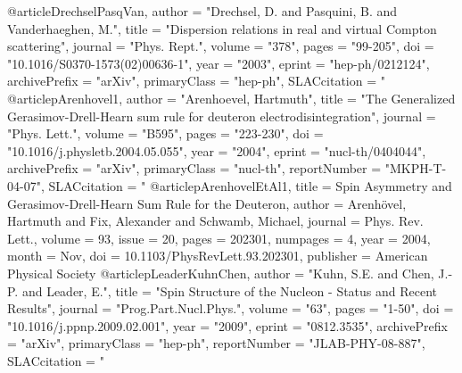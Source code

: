 @article{DrechselPasqVan,
      author         = "Drechsel, D. and Pasquini, B. and Vanderhaeghen, M.",
      title          = "{Dispersion relations in real and virtual Compton scattering}",
      journal        = "Phys. Rept.",
      volume         = "378",
      pages          = "99-205",
      doi            = "10.1016/S0370-1573(02)00636-1",
      year           = "2003",
      eprint         = "hep-ph/0212124",
      archivePrefix  = "arXiv",
      primaryClass   = "hep-ph",
      SLACcitation   = "%
}
@article{pArenhovel1,
      author         = "Arenhoevel, Hartmuth",
      title          = "{The Generalized Gerasimov-Drell-Hearn sum rule for deuteron electrodisintegration}",
      journal        = "Phys. Lett.",
      volume         = "B595",
      pages          = "223-230",
      doi            = "10.1016/j.physletb.2004.05.055",
      year           = "2004",
      eprint         = "nucl-th/0404044",
      archivePrefix  = "arXiv",
      primaryClass   = "nucl-th",
      reportNumber   = "MKPH-T-04-07",
      SLACcitation   = "%
}
@article{pArenhovelEtAl1,
  title = {Spin Asymmetry and Gerasimov-Drell-Hearn Sum Rule for the Deuteron},
  author = {Arenh\"ovel, Hartmuth and Fix, Alexander and Schwamb, Michael},
  journal = {Phys. Rev. Lett.},
  volume = {93},
  issue = {20},
  pages = {202301},
  numpages = {4},
  year = {2004},
  month = {Nov},
  doi = {10.1103/PhysRevLett.93.202301},
  publisher = {American Physical Society}
}
@article{pLeaderKuhnChen,
      author         = "Kuhn, S.E. and Chen, J.-P. and Leader, E.",
      title          = "{Spin Structure of the Nucleon - Status and Recent Results}",
      journal        = "Prog.Part.Nucl.Phys.",
      volume         = "63",
      pages          = "1-50",
      doi            = "10.1016/j.ppnp.2009.02.001",
      year           = "2009",
      eprint         = "0812.3535",
      archivePrefix  = "arXiv",
      primaryClass   = "hep-ph",
      reportNumber   = "JLAB-PHY-08-887",
      SLACcitation   = "%
}
